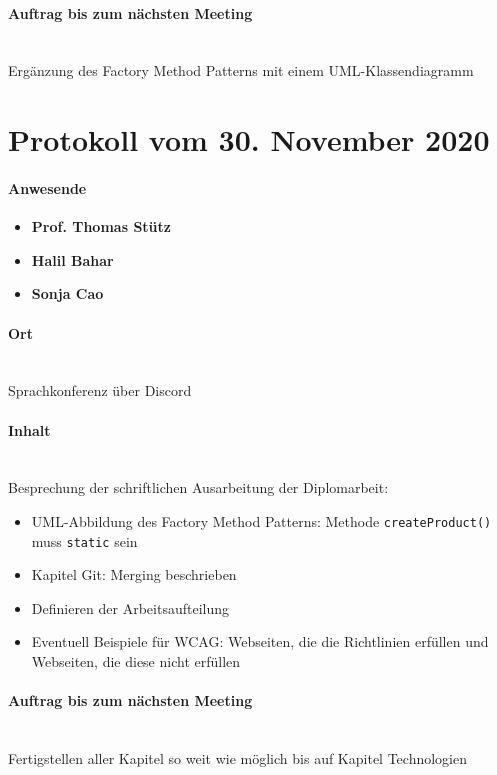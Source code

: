 \paragraph{Auftrag bis zum nächsten Meeting}\mbox{}\\
Ergänzung des Factory Method Patterns mit einem UML-Klassendiagramm

\section{Protokoll vom 30. November 2020}

\paragraph{Anwesende}
\begin{itemize}
	\item{\textbf{Prof. Thomas Stütz}}
	\item{\textbf{Halil Bahar}}
	\item{\textbf{Sonja Cao}}
\end{itemize}

\paragraph{Ort}\mbox{}\\
Sprachkonferenz über Discord

\paragraph{Inhalt}\mbox{}\\
Besprechung der schriftlichen Ausarbeitung der Diplomarbeit:
\begin{itemize}
	\item UML-Abbildung des Factory Method Patterns: Methode \texttt{createProduct()} muss \texttt{static} sein
	\item Kapitel Git: Merging beschrieben
	\item Definieren der Arbeitsaufteilung
	\item Eventuell Beispiele für WCAG: Webseiten, die die Richtlinien erfüllen und Webseiten, die diese nicht 
		erfüllen	
\end{itemize}

\paragraph{Auftrag bis zum nächsten Meeting}\mbox{}\\
Fertigstellen aller Kapitel so weit wie möglich bis auf Kapitel Technologien

